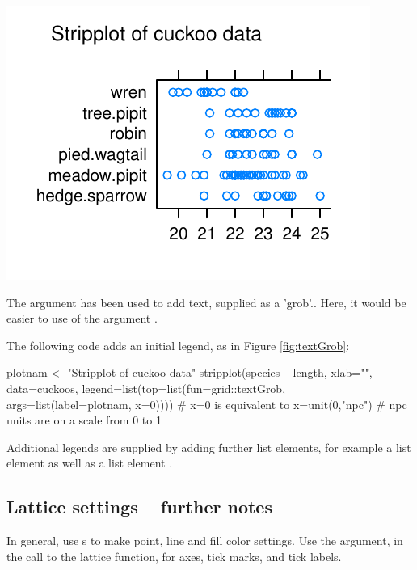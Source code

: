 \begin{marginfigure}[-36pt]
\begin{Schunk}


\centerline{\includegraphics[width=\textwidth]{figs/07-strip-grob-1} }

\end{Schunk}
\caption{The argument  has been used to add text,
  supplied as a 'grob'.\label{fig:textGrob}. Here, it would be
  easier to use of the argument .}
\end{marginfigure}

The following code adds an initial legend, as in Figure \ref{fig:textGrob}:
\begin{Schunk}
\begin{Sinput}
plotnam <- "Stripplot of cuckoo data"
stripplot(species ~ length, xlab="", data=cuckoos,
  legend=list(top=list(fun=grid::textGrob,
                       args=list(label=plotnam,
                                 x=0))))
# x=0 is equivalent to x=unit(0,"npc")
# npc units are on a scale from 0 to 1
\end{Sinput}
\end{Schunk}
Additional legends are supplied by adding further
  list elements, for example a list element  as well as a
  list element .

\subsection{Lattice settings -- further notes}\label{ss:latticeParam}

In general, use s to make point, line and fill color settings.
Use the  argument, in the call to the lattice function,
for axes, tick marks, and tick labels.

